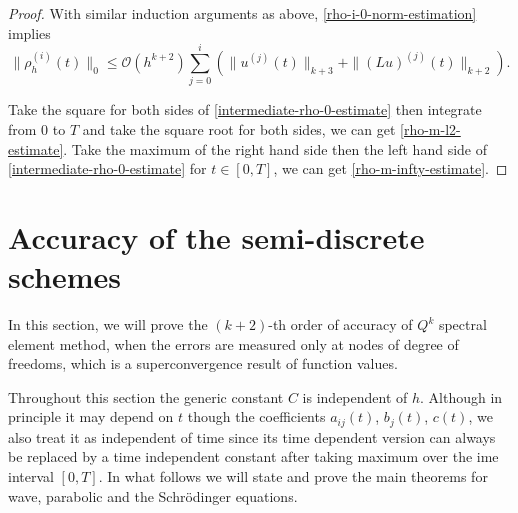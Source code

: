 \documentclass[onefignum,onetabnum]{siamart171218}
\begin{document}
\begin{proof}
 With similar induction arguments as above,  \eqref{rho-i-0-norm-estimation} implies 
 \begin{equation}\label{intermediate-rho-0-estimate}
 \|\rho^{(i)}_h( t)\|_0 \leq \mathcal O(h^{k+2})\sum_{j=0}^i(\|u^{(j)}( t)\|_{k+3}+\|(Lu)^{(j)}( t)\|_{k+2}).
 \end{equation}
 
Take the square for both sides of \eqref{intermediate-rho-0-estimate} then integrate from $0$ to $T$ and take the square root for both sides, we can get \eqref{rho-m-l2-estimate}. 
Take the maximum of the right hand side then the left hand side of \eqref{intermediate-rho-0-estimate} for $t\in[0,T]$, we can get \eqref{rho-m-infty-estimate}. 
\end{proof}


\section{ Accuracy of the semi-discrete schemes}\label{error-estimate}



In this section, we will prove the $(k+2)$-th order of accuracy of $Q^k$ spectral element method, when the errors are measured only at nodes of degree of freedoms, which is a superconvergence result of function values. 

 Throughout this section the generic constant $C$ is independent of $h$. Although in principle it may depend on $t$ though the coefficients $a_{ij}(t)$, $b_{j}(t)$, $c(t)$, we also treat it as independent of time since its time dependent version can always be replaced by a time independent constant after taking maximum over the ime interval $[0,T]$.    
 In what follows we will state and prove the main theorems for wave, parabolic and the Schr\"{o}dinger equations. 
\end{document}
